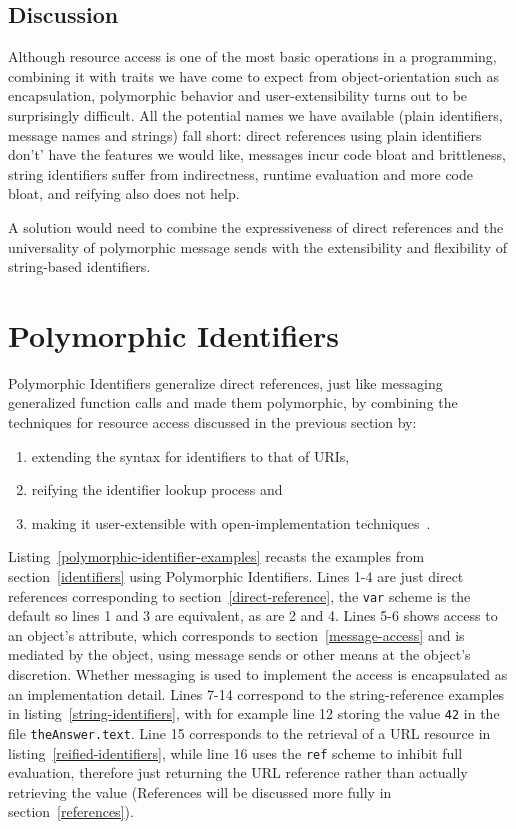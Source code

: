 \documentclass[preprint,authoryear]{llncs}
\begin{document}
\subsection{Discussion}

Although resource access is one of the most basic operations in a programming, combining it
with traits we have come to expect from object-orientation such as encapsulation, polymorphic
behavior and user-extensibility turns out to be surprisingly difficult.   All the potential names
we have available (plain identifiers, message names and strings) fall short:  direct references
using plain identifiers don't' have the features we would like, messages incur code bloat
and brittleness, string identifiers suffer from indirectness, runtime evaluation and more
code bloat, and reifying also does not help.

A solution would need to combine the expressiveness of direct references and the universality
of polymorphic message sends with the extensibility and flexibility of string-based identifiers.



\section{Polymorphic Identifiers}
\label{polymorphic-identifiers}

Polymorphic Identifiers
generalize direct references,  just like messaging generalized function calls and made them polymorphic,
by combining the techniques for resource access discussed in the previous 
section by:
\begin{enumerate}
\item extending the syntax for identifiers to that of URIs,
\item reifying the identifier lookup process and
\item making it user-extensible with open-implementation techniques~\cite{OpenImplementations}.
\end{enumerate}

Listing~\ref{polymorphic-identifier-examples} recasts the examples from section~\ref{identifiers} using
Polymorphic Identifiers.  Lines 1-4 are just direct references corresponding to section~\ref{direct-reference},
the {\tt var} scheme is the default so lines 1 and 3 are equivalent, as are 2 and 4.
Lines 5-6 shows access to an object's attribute, which corresponds to section~\ref{message-access} and is
mediated by the object, using message sends or other means at the object's discretion.  Whether messaging
is used to implement the access is encapsulated as an implementation detail.  Lines 7-14 correspond
to the string-reference examples in listing~\ref{string-identifiers}, with for example line 12 storing the
value {\tt 42} in the file {\tt theAnswer.text}.   Line 15 corresponds to the retrieval of a URL resource in listing~\ref{reified-identifiers}, while line 16 uses the {\tt ref} scheme to inhibit full evaluation, therefore just returning the
URL reference rather than actually retrieving the value (References will be discussed more fully in section~\ref{references}).
\end{document}
